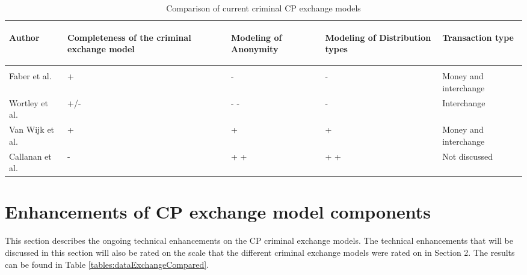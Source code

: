 \documentclass{sig-alternate-br}
\begin{document}
\begin{table}[!ht]
\caption{Comparison of current criminal CP exchange models}
\begin{tabular}{|p{}||p{}|p{}|p{}|p{}|}
\hline
\begin{sideways} \parbox{30mm}{\centering Author} \end{sideways} & \begin{sideways} \parbox{30mm}{\centering Completeness of the criminal exchange model} \end{sideways} & \begin{sideways} \parbox{30mm}{\centering Modeling of Anonymity} \end{sideways} &  \begin{sideways} \parbox{30mm}{\centering Modeling of Distribution types} \end{sideways} & \begin{sideways} \parbox{30mm}{\centering Transaction type} \end{sideways} \\ \hline & \\[-1em]\hline
Faber et al. \cite{en2011phishing} & + & - & - & Money and interchange \\ \hline
Wortley et al. \cite{wortley2006child} & +/- & - - & -  & Interchange \\ \hline
Van Wijk et al. \cite{wijk2009achter}   & + & + & + & Money and interchange \\ \hline
Callanan et al. \cite{callanan2009internet}   & - & + + & + + & Not discussed \\ \hline
\end{tabular}
\label{tables:exchangeModelsCompared}
\end{table}


\section{Enhancements of CP exchange model components}
This section describes the ongoing technical enhancements on the CP criminal exchange models. The technical enhancements that will be discussed in this section will also be rated on the scale that the different criminal exchange models were rated on in Section 2. The results can be found in Table \ref{tables:dataExchangeCompared}.
\end{document}
